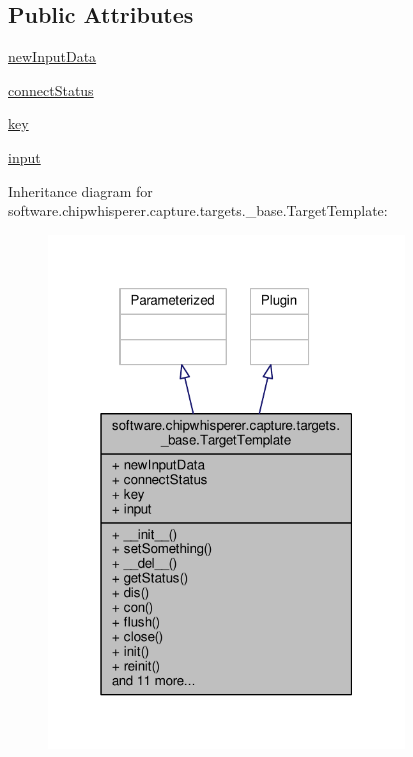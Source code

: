 \subsection*{Public Attributes}
\begin{DoxyCompactItemize}
\item 
\hyperlink{classsoftware_1_1chipwhisperer_1_1capture_1_1targets_1_1__base_1_1TargetTemplate_ad88478f3ee338f099b8f4a8aa1d3415f}{new\+Input\+Data}
\item 
\hyperlink{classsoftware_1_1chipwhisperer_1_1capture_1_1targets_1_1__base_1_1TargetTemplate_afceaca890613748ea8134753f51fe480}{connect\+Status}
\item 
\hyperlink{classsoftware_1_1chipwhisperer_1_1capture_1_1targets_1_1__base_1_1TargetTemplate_a782679d4a225fbcd21ba12d652c2fda6}{key}
\item 
\hyperlink{classsoftware_1_1chipwhisperer_1_1capture_1_1targets_1_1__base_1_1TargetTemplate_a48a15030a8ca5b5d9ab19e5dec55097e}{input}
\end{DoxyCompactItemize}


Inheritance diagram for software.\+chipwhisperer.\+capture.\+targets.\+\_\+base.\+Target\+Template\+:\nopagebreak
\begin{figure}[H]
\begin{center}
\leavevmode
\includegraphics[width=268pt]{d0/dc1/classsoftware_1_1chipwhisperer_1_1capture_1_1targets_1_1__base_1_1TargetTemplate__inherit__graph}
\end{center}
\end{figure}


